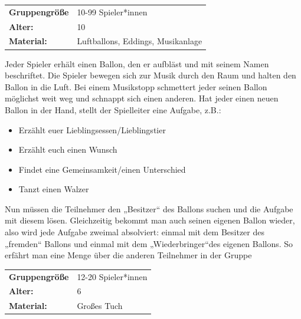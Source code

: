 


\newpage


\begin{table}[H]
\begin{tabular}{>{\bfseries}lp{8cm}}
   Gruppengröße   & 10-99 Spieler*innen\\
    Alter: & 10 \\
    Material: & Luftballons, Eddings, Musikanlage \\
\end{tabular}
\end{table} 
    
    Jeder Spieler erhält einen Ballon, den er aufbläst und mit seinem Namen beschriftet. Die Spieler bewegen sich zur Musik durch den Raum und halten den Ballon in die Luft. Bei  einem  Musikstopp  schmettert  jeder  seinen  Ballon möglichst weit weg und schnappt sich einen anderen. Hat jeder einen neuen Ballon in der Hand, stellt der Spielleiter eine Aufgabe, z.B.: 
    \begin{itemize}
        \item Erzählt euer Lieblingsessen/Lieblingstier
        \item Erzählt euch einen Wunsch
        \item Findet eine Gemeinsamkeit/einen Unterschied
        \item Tanzt einen Walzer
    \end{itemize}
    Nun müssen die Teilnehmer den „Besitzer“ des Ballons suchen und die Aufgabe mit diesem lösen. Gleichzeitig bekommt man auch seinen eigenen Ballon wieder, also wird jede Aufgabe zweimal absolviert: einmal mit dem Besitzer des „fremden“ Ballons und einmal mit dem „Wiederbringer“des eigenen Ballons. So erfährt man eine Menge über die anderen Teilnehmer in der Gruppe
    \\



\begin{table}[H]
\begin{tabular}{>{\bfseries}lp{8cm}}
   Gruppengröße   & 12-20 Spieler*innen\\
    Alter: & 6 \\
    Material: & Großes Tuch\\
\end{tabular}
\end{table} 


